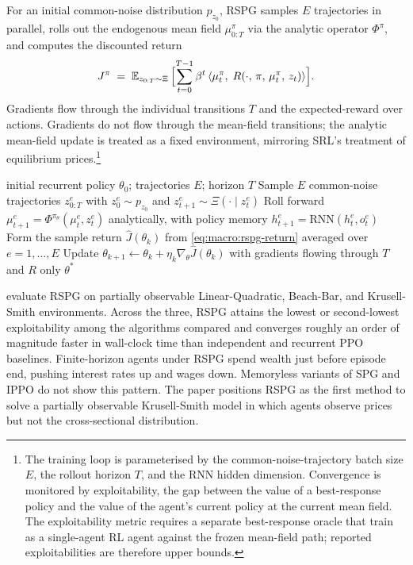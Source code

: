 For an initial common-noise distribution $p_{z_0}$, RSPG samples $E$
trajectories in parallel, rolls out the endogenous mean field
$\mu^\pi_{0:T}$ via the analytic operator $\Phi^\pi$, and computes
the discounted return
\begin{equation}
J^\pi \;=\; \mathbb{E}_{z_{0:T} \sim \Xi}\,\Bigl[\sum_{t=0}^{T-1} \beta^t \, \langle \mu^\pi_t,\; R(\cdot,\, \pi,\, \mu^\pi_t,\, z_t)\rangle\Bigr].
\label{eq:macro:rspg-return}
\end{equation}
Gradients flow through the individual transitions $T$ and the
expected-reward over actions. Gradients do not flow through the
mean-field transitions; the analytic mean-field update is treated as
a fixed environment, mirroring SRL's treatment of equilibrium
prices.\footnote{The training loop is parameterised by the
common-noise-trajectory batch size $E$, the rollout horizon $T$, and
the RNN hidden dimension. Convergence is monitored by exploitability,
the gap between the value of a best-response policy and the value of
the agent's current policy at the current mean field. The
exploitability metric requires a separate best-response oracle that
\citet{Wibault2026rspg} train as a single-agent RL agent against the
frozen mean-field path; reported exploitabilities are therefore upper
bounds.}

\begin{algorithm}[t]
\caption{Recurrent Structural Policy Gradient (RSPG)}
\label{alg:macro:rspg}
\begin{algorithmic}[1]
\Require initial recurrent policy $\theta_0$; trajectories $E$; horizon $T$
  \State Sample $E$ common-noise trajectories $z^e_{0:T}$ with $z^e_0 \sim p_{z_0}$ and $z^e_{t+1} \sim \Xi(\cdot \mid z^e_t)$
  \State Roll forward $\mu^e_{t+1} = \Phi^{\pi_\theta}(\mu^e_t, z^e_t)$ analytically, with policy memory $h^e_{t+1} = \mathrm{RNN}(h^e_t, o^e_t)$
  \State Form the sample return $\widehat{J}(\theta_k)$ from \eqref{eq:macro:rspg-return} averaged over $e = 1, \ldots, E$
  \State Update $\theta_{k+1} \leftarrow \theta_k + \eta_k \nabla_\theta \widehat{J}(\theta_k)$ with gradients flowing through $T$ and $R$ only
\EndFor
\State \Return $\theta^*$
\end{algorithmic}
\end{algorithm}

\citet{Wibault2026rspg} evaluate RSPG on partially observable
Linear-Quadratic, Beach-Bar, and Krusell-Smith environments. Across
the three, RSPG attains the lowest or second-lowest exploitability
among the algorithms compared and converges roughly an order of
magnitude faster in wall-clock time than independent and recurrent
PPO baselines. Finite-horizon agents under RSPG spend wealth just
before episode end, pushing interest rates up and wages down.
Memoryless variants of SPG and IPPO do not show this pattern. The
paper positions RSPG as the first method to solve a partially
observable Krusell-Smith model in which agents observe prices but
not the cross-sectional distribution.

